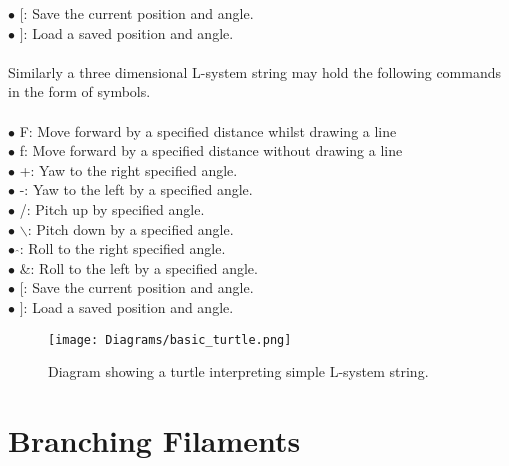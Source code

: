 $\bullet$ $[$: 				\hspace{10mm} 		Save the current position and angle. \\
$\bullet$ $]$: 				\hspace{10mm} 		Load a saved position and angle. \\
\\
Similarly a three dimensional L-system string may hold the following commands in the form of symbols. \\
\\ 
$\bullet$ F: 				\hspace{10mm}  		Move forward by a specified distance whilst drawing a line \\
$\bullet$ f: 				\hspace{10mm} 		Move forward by a specified distance without drawing a line \\
$\bullet$ +: 				\hspace{10mm} 		Yaw to the right specified angle. \\
$\bullet$ -: 				\hspace{10mm} 		Yaw to the left by a specified angle.  \\
$\bullet$ /: 				\hspace{10mm} 		Pitch up by specified angle. \\
$\bullet$ $\backslash$: 	\hspace{10mm} 		Pitch down by a specified angle.  \\
$\bullet$ $\hat{}$: 		\hspace{10mm} 		Roll to the right specified angle. \\
$\bullet$ \&:				\hspace{10mm}  		Roll to the left by a specified angle.  \\
$\bullet$ $[$: 				\hspace{10mm} 		Save the current position and angle. \\
$\bullet$ $]$: 				\hspace{10mm}		Load a saved position and angle. \\

\begin{figure}[htbp]
	{\centering
		\vspace{7px}
		\texttt{[image: Diagrams/basic\_turtle.png]}
		\caption{Diagram showing a turtle interpreting simple L-system string.}
	}
\end{figure}
\FloatBarrier

\section{Branching Filaments}

